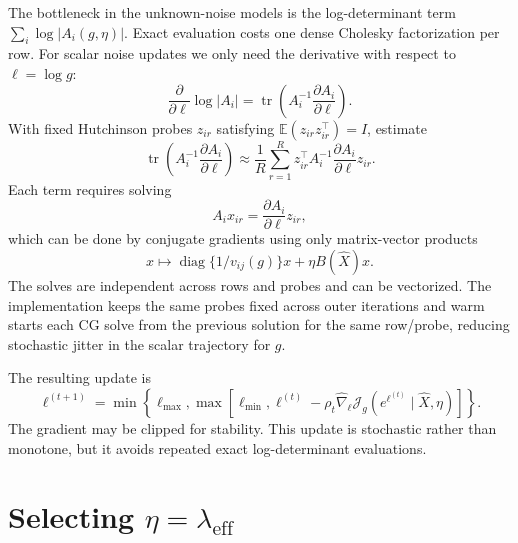 \documentclass[11pt]{article}
\begin{document}
The bottleneck in the unknown-noise models is the log-determinant term
$\sum_i\log|A_i(g,\eta)|$.  Exact evaluation costs one dense Cholesky factorization
per row.  For scalar noise updates we only need the derivative with respect to
$\ell=\log g$:
\begin{equation}
    \frac{\partial}{\partial \ell}
    \log |A_i|
    =
    \operatorname{tr}
    \left(
        A_i^{-1}
        \frac{\partial A_i}{\partial \ell}
    \right).
\end{equation}
With fixed Hutchinson probes $z_{ir}$ satisfying
$\mathbb{E}(z_{ir}z_{ir}^\top)=I$, estimate
\begin{equation}
    \operatorname{tr}
    \left(
        A_i^{-1}
        \frac{\partial A_i}{\partial \ell}
    \right)
    \approx
    \frac{1}{R}
    \sum_{r=1}^R
    z_{ir}^\top
    A_i^{-1}
    \frac{\partial A_i}{\partial \ell}
    z_{ir}.
\end{equation}
Each term requires solving
\begin{equation}
    A_i x_{ir}
    =
    \frac{\partial A_i}{\partial \ell}z_{ir},
\end{equation}
which can be done by conjugate gradients using only matrix-vector products
\begin{equation}
    x
    \mapsto
    \operatorname{diag}\{1/v_{ij}(g)\}x
    +
    \eta B(\hat X)x.
\end{equation}
The solves are independent across rows and probes and can be vectorized.  The
implementation keeps the same probes fixed across outer iterations and warm
starts each CG solve from the previous solution for the same row/probe, reducing
stochastic jitter in the scalar trajectory for $g$.

The resulting update is
\begin{equation}
    \ell^{(t+1)}
    =
    \min\left\{
        \ell_{\max},
        \max\left[
            \ell_{\min},
            \ell^{(t)}
            -
            \rho_t
            \widehat{\nabla}_{\ell}
            \mathcal{J}_{g}(e^{\ell^{(t)}}\mid \hat X,\eta)
        \right]
    \right\}.
\end{equation}
The gradient may be clipped for stability.  This update is stochastic rather
than monotone, but it avoids repeated exact log-determinant evaluations.

\section{Selecting \texorpdfstring{$\eta=\lambda_{\mathrm{eff}}$}{eta = lambda_eff}}
\end{document}

